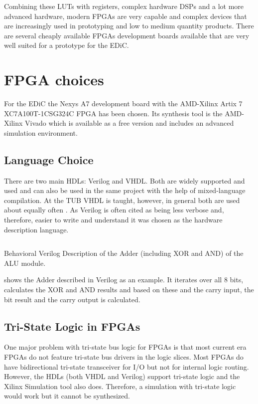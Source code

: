 Combining these \glspl{LUT} with registers, complex hardware \glspl{DSP} and a lot more advanced hardware, modern \glspl{FPGA} are very capable and complex devices that are increasingly used in prototyping and low to medium quantity products.
There are several cheaply available \glspl{FPGA} development boards available that are very well suited for a prototype for the \gls{EDiC}.

\section{\gls{FPGA} choices}
For the \gls{EDiC} the Nexys A7 development board \cite{nexysA7} with the AMD-Xilinx Artix 7 XC7A100T-1CSG324C \gls{FPGA} has been chosen.
Its synthesis tool is the AMD-Xilinx Vivado \cite{vivado} which is available as a free version and includes an advanced simulation environment.

\subsection{Language Choice}
There are two main \glspl{HDL}: Verilog and \gls{VHDL}.
Both are widely supported and used and can also be used in the same project with the help of mixed-language compilation.
At the \gls{TUB} \gls{VHDL} is taught, however, in general both are used about equally often \cite{vhdlVerilog}.
As Verilog is often cited as being less verbose and, therefore, easier to write and understand it was chosen as the hardware description language.

\begin{listing}
  \inputminted[linenos,
    breaklines,
    firstline=65,
    lastline=71,
    frame=leftline,
    xleftmargin=20pt,
  ]{verilog}{src/alu.v}
  \caption{Behavioral Verilog Description of the Adder (including XOR and AND) of the \gls{ALU} module.}
  \label{lst:alu}
\end{listing}
 shows the Adder described in Verilog as an example.
It iterates over all 8 bits, calculates the XOR and AND results and based on these and the carry input, the bit result and the carry output is calculated.

\subsection{Tri-State Logic in \glspl{FPGA}}
One major problem with tri-state bus logic for \glspl{FPGA} is that most current era \glspl{FPGA} do not feature tri-state bus drivers in the logic slices.
Most \glspl{FPGA} do have bidirectional tri-state transceiver for I/O but not for internal logic routing.
However, the \glspl{HDL} (both \gls{VHDL} and Verilog) support tri-state logic and the Xilinx Simulation tool also does.
Therefore, a simulation with tri-state logic would work but it cannot be synthesized.


